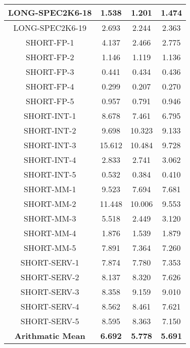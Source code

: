 \documentclass[paper=letter, fontsize=12pt]{article}
\begin{document}
\begin{table}[!h]
\begin{center}
\begin{tabular}{| c | c | c | c |}
LONG-SPEC2K6-18     &        1.538  &       1.201    &      1.474 \\ \hline   
LONG-SPEC2K6-19     &        2.693  &       2.244    &      2.363 \\ \hline   
SHORT-FP-1          &        4.137  &       2.466    &      2.775 \\ \hline   
SHORT-FP-2          &        1.146  &       1.119    &      1.136 \\ \hline   
SHORT-FP-3          &        0.441  &       0.434    &      0.436 \\ \hline   
SHORT-FP-4          &        0.299  &       0.207    &      0.270 \\ \hline   
SHORT-FP-5          &        0.957  &       0.791    &      0.946 \\ \hline   
SHORT-INT-1         &        8.678  &       7.461    &      6.795 \\ \hline   
SHORT-INT-2         &        9.698  &      10.323    &      9.133 \\ \hline   
SHORT-INT-3         &       15.612  &      10.484    &      9.728 \\ \hline   
SHORT-INT-4         &        2.833  &       2.741    &      3.062 \\ \hline   
SHORT-INT-5         &        0.532  &       0.384    &      0.410 \\ \hline   
SHORT-MM-1          &        9.523  &       7.694    &      7.681 \\ \hline   
SHORT-MM-2          &       11.448  &      10.006    &      9.553 \\ \hline   
SHORT-MM-3          &        5.518  &       2.449    &      3.120 \\ \hline   
SHORT-MM-4          &        1.876  &       1.539    &      1.879 \\ \hline   
SHORT-MM-5          &        7.891  &       7.364    &      7.260 \\ \hline   
SHORT-SERV-1        &        7.874  &       7.780    &      7.353 \\ \hline   
SHORT-SERV-2        &        8.137  &       8.320    &      7.626 \\ \hline   
SHORT-SERV-3        &        8.358  &       9.159    &      9.010 \\ \hline   
SHORT-SERV-4        &        8.562  &       8.461    &      7.621 \\ \hline   
SHORT-SERV-5        &        8.595  &       8.363    &      7.150 \\ \hline   
\textbf{Arithmatic Mean}     &        \textbf{6.692}  &       \textbf{5.778}    &      \textbf{5.691} \\ \hline 

\end{tabular}
\end{center}
\end{table}
\end{document}
